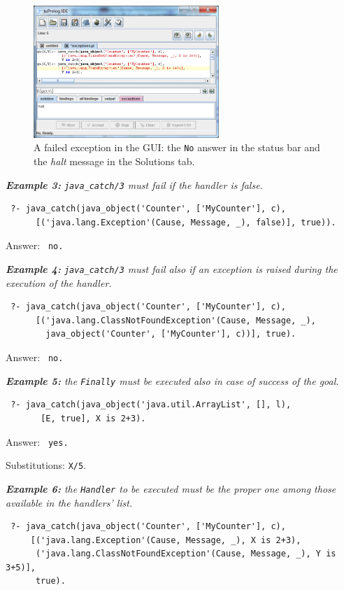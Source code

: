 \begin{figure}
  \centering
  \includegraphics[width=7cm]{images/exceptions2}
  \caption{A failed exception in the \tuprolog{} GUI: the \texttt{No} answer in the status bar and the \textit{halt} message in the Solutions tab.}
  \label{fig:exceptions2}
\end{figure}


\medskip\noindent
\textit{\textbf{Example 3:} \texttt{java\_catch/3} must fail if the handler is false.}
\begin{verbatim}
 ?- java_catch(java_object('Counter', ['MyCounter'], c),
      [('java.lang.Exception'(Cause, Message, _), false)], true)).
\end{verbatim}

Answer: \texttt{ no.}

\medskip\noindent
\textit{\textbf{Example 4:} \texttt{java\_catch/3} must fail also if an exception is raised during the execution of the handler.}
\begin{verbatim}
 ?- java_catch(java_object('Counter', ['MyCounter'], c),
      [('java.lang.ClassNotFoundException'(Cause, Message, _),
        java_object('Counter', ['MyCounter'], c))], true).
\end{verbatim}

Answer: \texttt{ no.}

\medskip\noindent
\textit{\textbf{Example 5:} the \textit{\texttt{Finally}} must be executed also in case of success of the goal.}
\begin{verbatim}
 ?- java_catch(java_object('java.util.ArrayList', [], l),
       [E, true], X is 2+3).
\end{verbatim}

Answer: \texttt{ yes.}

Substitutions: \texttt{X/5}.

\medskip\noindent
\textit{\textbf{Example 6:} the \textit{\texttt{Handler}} to be executed must be the proper one among those available in the handlers' list.}
\begin{verbatim}
 ?- java_catch(java_object('Counter', ['MyCounter'], c),
     [('java.lang.Exception'(Cause, Message, _), X is 2+3),
      ('java.lang.ClassNotFoundException'(Cause, Message, _), Y is 3+5)],
      true).
\end{verbatim}

